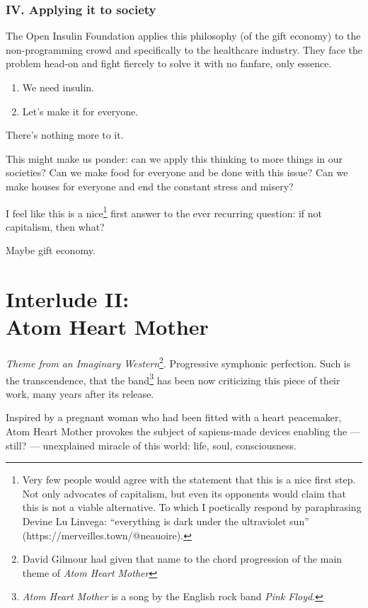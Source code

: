 \subsection{IV. Applying it to society}

The Open Insulin Foundation applies this philosophy (of the gift economy) to the non-programming crowd and specifically to the healthcare industry. They face the problem head-on and fight fiercely to solve it with no fanfare, only essence.

\begin{enumerate}
    \item{We need insulin.}
    \item{Let’s make it for everyone.}
\end{enumerate}

There’s nothing more to it.

This might make us ponder: can we apply this thinking to more things in our societies? Can we make food for everyone and be done with this issue? Can we make houses for everyone and end the constant stress and misery?

I feel like this is a nice\footnote{Very few people would agree with the statement that this is a nice first step. Not only advocates of capitalism, but even its opponents would claim that this is not a viable alternative. To which I poetically respond by paraphrasing Devine Lu Linvega: “everything is dark under the ultraviolet sun” (https://merveilles.town/@neauoire).} first answer to the ever recurring question: if not capitalism, then what?

Maybe gift economy.

\chapter*{Interlude II:\\Atom Heart Mother}

\emph{Theme from an Imaginary Western}\footnote{David Gilmour had given that name to the chord progression of the main theme of \emph{Atom Heart Mother}}. Progressive symphonic perfection. Such is the transcendence, that the band\footnote{\emph{Atom Heart Mother} is a song by the English rock band \emph{Pink Floyd}.} has been now criticizing this piece of their work, many years after its release.

Inspired by a pregnant woman who had been fitted with a heart peacemaker, Atom Heart Mother provokes the subject of sapiens-made devices enabling the — still? — unexplained miracle of this world: life, soul, consciousness.

